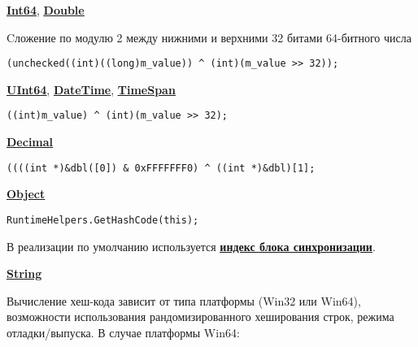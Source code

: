 \href{https://vk.cc/atQtNM}{\underline{\textbf{Int64}}}, \href{https://vk.cc/atQtRv}{\underline{\textbf{Double}}}

\vspace{\baselineskip}

Cложение по модулю 2 между нижними и верхними 32 битами 64-битного числа

\begin{tcolorbox}
\begin{verbatim}
(unchecked((int)((long)m_value)) ^ (int)(m_value >> 32));
\end{verbatim}
\end{tcolorbox}

\href{https://vk.cc/atQu4j}{\underline{\textbf{UInt64}}}, \href{https://vk.cc/atQu6V}{\underline{\textbf{DateTime}}}, \href{https://vk.cc/atQua1}{\underline{\textbf{TimeSpan}}}

\begin{tcolorbox}
\begin{verbatim}
((int)m_value) ^ (int)(m_value >> 32);
\end{verbatim}
\end{tcolorbox}

\href{https://vk.cc/atQugO}{\underline{\textbf{Decimal}}}

\begin{tcolorbox}
\begin{verbatim}
((((int *)&dbl([0]) & 0xFFFFFFF0) ^ ((int *)&dbl)[1];
\end{verbatim}
\end{tcolorbox}

\href{https://vk.cc/atQuuJ}{\underline{\textbf{Object}}}

\begin{tcolorbox}
\begin{verbatim}
RuntimeHelpers.GetHashCode(this);
\end{verbatim}
\end{tcolorbox}

В реализации по умолчанию используется \href{https://vk.cc/atQuBF}{\underline{\textbf{индекс блока синхронизации}}}.

\vspace{\baselineskip}

\href{https://vk.cc/atQuHi}{\underline{\textbf{String}}}

\vspace{\baselineskip}

Вычисление хеш-кода зависит от типа платформы (Win32 или Win64), возможности использования рандомизированного хеширования строк, режима отладки/выпуска. В случае платформы Win64:

